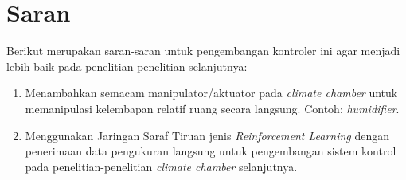 \section{Saran}

Berikut merupakan saran-saran untuk pengembangan kontroler ini agar menjadi lebih baik pada penelitian-penelitian selanjutnya:
\begin{enumerate}
	\item Menambahkan semacam manipulator/aktuator pada \textit{climate chamber} untuk memanipulasi kelembapan relatif ruang secara langsung. Contoh: \textit{humidifier}.
	\item Menggunakan Jaringan Saraf Tiruan jenis \textit{Reinforcement Learning} dengan penerimaan data pengukuran langsung untuk pengembangan sistem kontrol pada penelitian-penelitian \textit{climate chamber} selanjutnya.
\end{enumerate}


